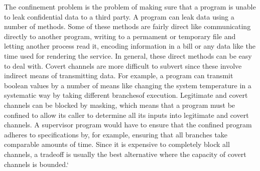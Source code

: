 \documentclass[twoside]{article}
\begin{document}
The confinement problem is the problem of making sure that a program is unable to leak confidential data to a third party. A program can leak data using a number of methods. Some of these methods are fairly direct like communicating directly to another program, writing to a permament or temporary file and letting another process read it, encoding information in a bill or any data like the time used for rendering the service. In general, these direct methods can be easy to deal with. Covert channels are more difficult to subvert since these involve indirect means of transmitting data. For example, a program can transmit boolean values by a number of means like changing the system temperature in a systematic way by taking different branchesof execution.  
Legitimate and covert channels can be blocked by masking, which means that a program must be confined to allow its caller to determine all its inputs into legitimate and covert channels. A supervisor program would have to ensure that the confined program adheres to specifications by, for example, ensuring that all branches take comparable amounts of time. 
Since it is expensive to completely block all channels, a tradeoff is usually the best alternative where the capacity of covert channels is bounded.`
\end{document}

